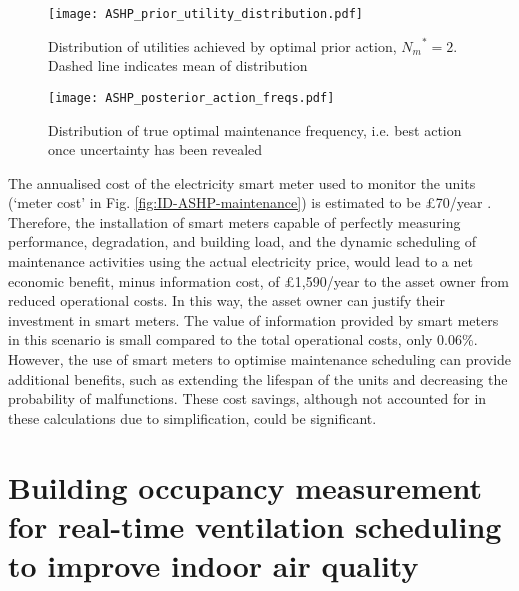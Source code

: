\begin{figure}[h]
    \centering
    \begin{minipage}{.475\textwidth}
        \centering
        \texttt{[image: ASHP\_prior\_utility\_distribution.pdf]}
        \caption{Distribution of utilities achieved by optimal prior action, ${N_m}^*=2$. Dashed line indicates mean of distribution}
        \label{fig:ASHP-prior-dist}
    \end{minipage}%
    \hfill
    \begin{minipage}{.475\textwidth}
        \centering
        \texttt{[image: ASHP\_posterior\_action\_freqs.pdf]}
        \caption{Distribution of true optimal maintenance frequency, i.e. best action once uncertainty has been revealed}
    \label{fig:ASHP-post-action-freqs}
    \end{minipage}%
\end{figure}

\newpage
The annualised cost of the electricity smart meter used to monitor the  units (`meter cost' in Fig. \ref{fig:ID-ASHP-maintenance}) is estimated to be £70/year \citep{daikin2022DaikinUKPrice}. Therefore, the installation of smart meters capable of perfectly measuring  performance, degradation, and building load, and the dynamic scheduling of maintenance activities using the actual electricity price, would lead to a net economic benefit,  minus information cost, of £1,590/year to the asset owner from reduced operational costs. In this way, the asset owner can justify their investment in smart meters.
The value of information provided by smart meters in this scenario is small compared to the total operational costs, only 0.06\%. However, the use of smart meters to optimise maintenance scheduling can provide additional benefits, such as extending the lifespan of the  units and decreasing the probability of malfunctions. These cost savings, although not accounted for in these calculations due to simplification, could be significant.\\


\section[Office ventilation scheduling]{Building occupancy measurement for real-time ventilation scheduling to improve indoor air quality} \label{sec:vent}

